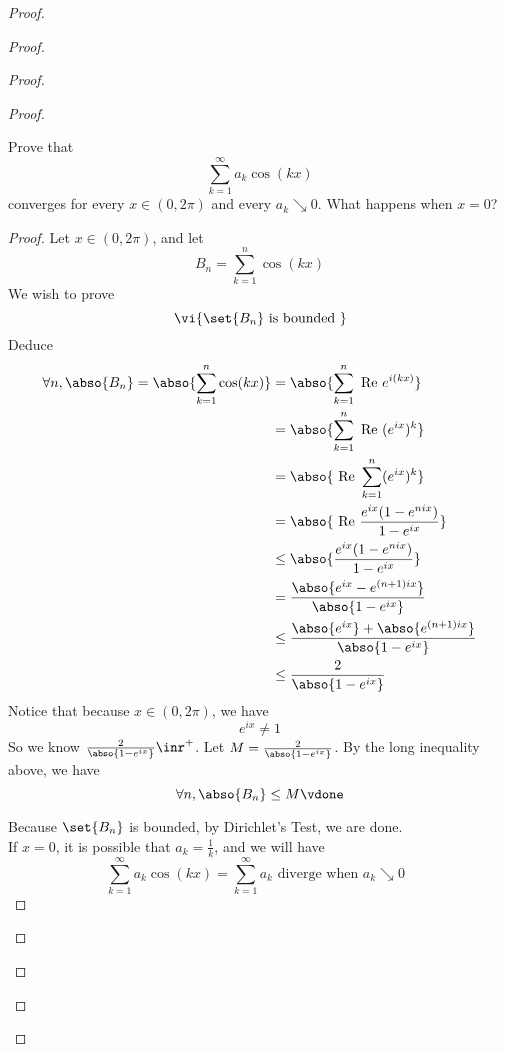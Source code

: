 \documentclass{report}
\begin{document}
\begin{proof}
\begin{proof}
\begin{proof}
\begin{proof}
\begin{question}{}{}
Prove that 
\[
\sum_{k=1}^{\infty} a_k \cos(kx)
\]
converges for every \( x \in (0, 2\pi) \) and every \( a_k \searrow 0 \). What happens when \( x = 0 \)?
\end{question}
\begin{proof}
Let $x\in (0,2\pi)$, and let 
\begin{equation*}
B_n=\sum_{k=1}^n \cos(kx)
\end{equation*}
We wish to prove
\begin{equation*}
\vi{\set{B_n}\text{ is bounded }}
\end{equation*}
Deduce
\begin{align*}
  \forall n,\abso{B_n}=\abso{\sum_{k=1}^n \cos (kx)}&= \abso{\sum_{k=1}^n \text{ Re }e^{i(kx)}}\\
  &=\abso{\sum_{k=1}^n \text{ Re }(e^{ix})^k}\\
  &=\abso{\text{ Re }\sum_{k=1}^n (e^{ix})^k}\\
  &=\abso{\text{ Re }\frac{e^{ix}(1-e^{nix})}{1-e^{ix}}}\\
  &\leq \abso{\frac{e^{ix}(1-e^{nix})}{1-e^{ix}}}\\
  &=\frac{\abso{e^{ix}-e^{(n+1)ix}}}{\abso{1-e^{ix}}}\\
  &\leq \frac{\abso{e^{ix}}+\abso{e^{(n+1)ix}}}{\abso{1-e^{ix}}}\\
  &\leq \frac{2}{\abso{1-e^{ix}}}
\end{align*}
Notice that because $x\in (0,2\pi)$, we have
\begin{equation*}
e^{ix}\neq 1
\end{equation*}
So we know $\frac{2}{\abso{1-e^{ix}}}\inr^+$. Let $M=\frac{2}{\abso{1-e^{ix}}}$. By the long inequality above, we have
\begin{equation*}
\forall n, \abso{B_n}\leq M\vdone
\end{equation*}

Because $\set{B_n}$ is bounded, by Dirichlet's Test, we are done.\\

If $x=0$, it is possible that  $a_k=\frac{1}{k}$, and we will have
\begin{equation*}
\sum_{k=1}^\infty a_k\cos(kx)=\sum_{k=1}^\infty a_k\text{ diverge when $a_k\searrow 0$ }
\end{equation*}
\end{proof}


\end{proof}
\end{proof}
\end{proof}
\end{proof}
\end{document}
